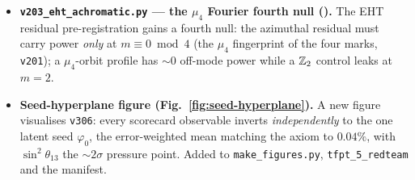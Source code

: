 \documentclass[11pt]{article}
\begin{document}
\begin{itemize}
  split is made an explicit anti-numerology firewall rule: $\phi=2\cos(\pi/5)\in\mathbb Q(\sqrt5)$ is the
  \emph{static} carrier ($\Z/5$) field, every \emph{dynamic} rate is rational ($\mathbb Q$, the $\Z/6$ hand), so a
  dynamic rate explained by $\phi$ is a cross-field false friend (\texttt{v314}/\texttt{v315}).
\item \textbf{\texttt{v203\_eht\_achromatic.py} --- the $\mu_4$ Fourier fourth null (\mX).} The EHT residual
  pre-registration gains a fourth null: the azimuthal residual must carry power \emph{only} at $m\equiv0\bmod4$
  (the $\mu_4$ fingerprint of the four marks, \texttt{v201}); a $\mu_4$-orbit profile has $\sim0$ off-mode power
  while a $\mathbb{Z}_2$ control leaks at $m=2$.
\item \textbf{Seed-hyperplane figure (Fig.~\ref{fig:seed-hyperplane}).} A new figure visualises \texttt{v306}:
  every scorecard observable inverts \emph{independently} to the one latent seed $\varphi_0$, the error-weighted
  mean matching the axiom to $0.04\%$, with $\sin^2\theta_{13}$ the $\sim2\sigma$ pressure point. Added to
  \texttt{make\_figures.py}, \texttt{tfpt\_5\_redteam} and the manifest.
\end{itemize}
\end{document}
